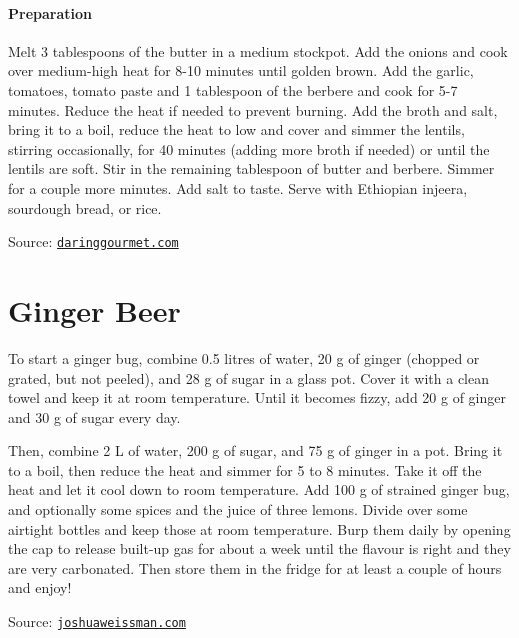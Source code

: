 \paragraph{Preparation}
Melt 3 tablespoons of the butter in a medium stockpot.  Add the onions and cook over medium-high heat for 8-10 minutes until golden brown.  
Add the garlic, tomatoes, tomato paste and 1 tablespoon of the berbere and cook for 5-7 minutes. Reduce the heat if needed to prevent burning.
Add the broth and salt, bring it to a boil, reduce the heat to low and cover and simmer the lentils, stirring occasionally, for 40 minutes (adding more broth if needed) or until the lentils are soft.
Stir in the remaining tablespoon of butter and berbere. Simmer for a couple more minutes. Add salt to taste.
Serve with Ethiopian injeera, sourdough bread, or rice.

Source: \href{https://www.daringgourmet.com/misir-wat-ethiopian-spiced-red-lentils/}{\texttt{daringgourmet.com}}

\section*{Ginger Beer}

To start a ginger bug, combine 0.5 litres of water, 20 g of ginger (chopped or grated, but not peeled), and 28 g of sugar in a glass pot. Cover it with a clean towel and keep it at room temperature. Until it becomes fizzy, add 20 g of ginger and 30 g of sugar every day.

Then, combine 2 L of water, 200 g of sugar, and 75 g of ginger in a pot. Bring it to a boil, then reduce the heat and simmer for 5 to 8 minutes. Take it off the heat and let it cool down to room temperature. Add 100 g of strained ginger bug, and optionally some spices and the juice of three lemons. Divide over some airtight bottles and keep those at room temperature. Burp them daily by opening the cap to release built-up gas for about a week until the flavour is right and they are very carbonated. Then store them in the fridge for at least a couple of hours and enjoy!

Source: \href{https://www.joshuaweissman.com/post/fermented-ginger-beer}{\texttt{joshuaweissman.com}}
